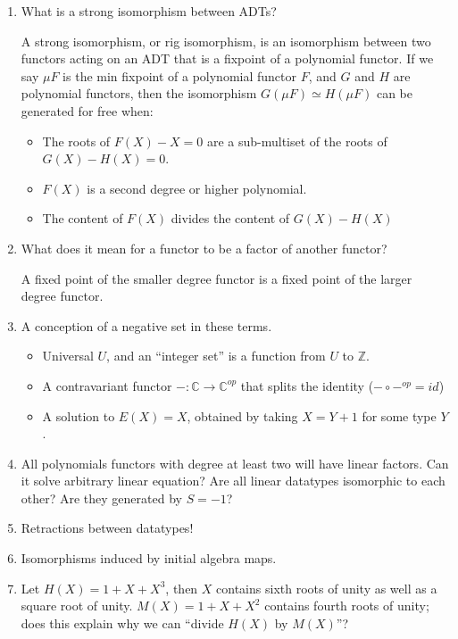 \documentclass{scrartcl}
\newcommand{\cat}{\mathbb{C}}
\newcommand{\op}{{op}}
\begin{document}
\begin{enumerate}
  \item What is a strong isomorphism between ADTs?

  A strong isomorphism, or rig isomorphism, is an isomorphism between two functors acting on an ADT that is a fixpoint of a polynomial functor.  If we say $\mu F$ is the min fixpoint of a polynomial functor $F$, and $G$ and $H$ are polynomial functors, then the isomorphism $G(\mu F) \simeq H(\mu F)$ can be generated for free when:
  \begin{itemize}
  \item The roots of $F(X) - X = 0$ are a sub-multiset of the roots of $G(X) - H(X) = 0$.
  \item $F(X)$ is a second degree or higher polynomial.
  \item The content of $F(X)$ divides the content of $G(X) - H(X)$
  \end{itemize}

  \item What does it mean for a functor to be a factor of another functor?

  A fixed point of the smaller degree functor is a fixed point of the larger degree functor.

  \item A conception of a negative set in these terms.
  \begin{itemize}
    \item Universal $U$, and an ``integer set'' is a function from $U$ to $\mathbb{Z}$.
    \item A contravariant functor $- : \cat \to \cat^\op$ that splits the identity
    ($- \circ -^\op = id$)
    \item A solution to $E(X)=X$, obtained by taking $X = Y + 1$ for some type $Y$.
  \end{itemize}
  \item All polynomials functors with degree at least two will have linear factors.
  Can it solve arbitrary linear equation?
  Are all linear datatypes isomorphic to each other?  Are they generated by $S = -1$?
  \item Retractions between datatypes!
  \item Isomorphisms induced by initial algebra maps.
  \item Let $H(X) = 1 + X + X^3$, then $X$ contains sixth roots of unity as well as
  a square root of unity.  $M(X) = 1 + X + X^2$ contains fourth roots of unity;
  does this explain why we can ``divide $H(X)$ by $M(X)$''?


\end{enumerate}
\end{document}
